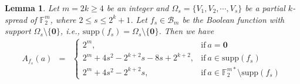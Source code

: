 \documentclass[10pt]{article}
\newtheorem{lemma}{Lemma}
\newcommand{\F}{\mathbb{F}}
\newcommand{\0}{\textbf{0}}
\newcommand{\1}{\textbf{1}}
\begin{document}
\begin{lemma}\label{L:Walsh-PS}
Let $m=2k\geq 4$ be an integer and $\Omega_s=\{V_1,V_2,\cdots,V_s\}$ be a partial $k$-spread of $\F_2^m$, where $2\leq s\leq 2^k+1$.
Let $f_s\in\mathcal{B}_{m}$ be the Boolean function with support $\Omega_s\setminus\{\0\}$, i.e.,
$\mathrm{supp}(f_s)=\Omega_s\setminus\{\0\}$. Then we have
\begin{eqnarray*}
A_{f_s}(a)
&=& \left\{
\begin{array}{llllll}
2^m,&\mathrm{if~}a=\0\\
2^m+4s^2-2^{k+2}s-8s+2^{k+2},&\mathrm{if~}a\in\mathrm{supp}(f_s)\\
2^m+4s^2-2^{k+2}s,&\mathrm{if~}a\in\F_2^{m*}\setminus\mathrm{supp}(f_s)
\end{array}
\right.
\end{eqnarray*}
\end{lemma}
\end{document}
